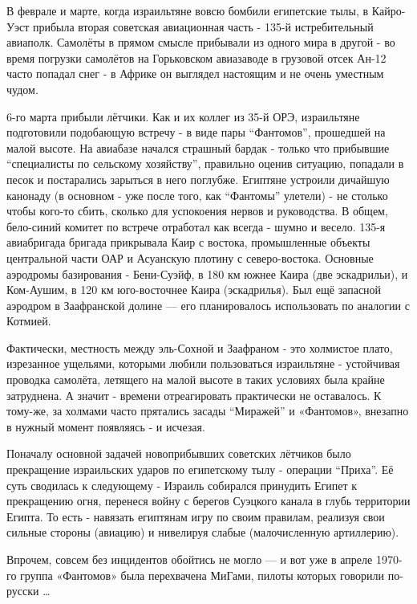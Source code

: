 В феврале и марте, когда израильтяне вовсю бомбили египетские тылы, в Кайро-Уэст прибыла вторая советская авиационная часть - 135-й истребительный авиаполк. Самолёты в прямом смысле прибывали из одного мира в другой - во время погрузки самолётов на Горьковском авиазаводе в грузовой отсек Ан-12 часто попадал снег - в Африке он выглядел настоящим и не очень уместным чудом.

6-го марта прибыли лётчики. Как и их коллег из 35-й ОРЭ, израильтяне подготовили подобающую встречу - в виде пары “Фантомов”, прошедшей на малой высоте. На авиабазе начался страшный бардак - только что прибывшие “специалисты по сельскому хозяйству”, правильно оценив ситуацию, попадали в песок и постарались зарыться в него поглубже. Египтяне устроили дичайшую канонаду (в основном - уже после того, как “Фантомы” улетели) - не столько чтобы кого-то сбить, сколько для успокоения нервов и руководства. В общем, бело-синий комитет по встрече отработал как всегда - шумно и весело. 
135-я авиабригада бригада прикрывала Каир с востока, промышленные объекты центральной части ОАР и Асуанскую плотину с северо-востока. Основные аэродромы базирования - Бени-Суэйф, в 180 км южнее Каира (две эскадрильи), и Ком-Аушим, в 120 км юго-восточнее Каира (эскадрилья). Был ещё запасной аэродром в Заафранской долине — его планировалось использовать по аналогии с Котмией.

Фактически, местность между эль-Сохной и Заафраном - это холмистое плато, изрезанное ущельями, которыми любили пользоваться израильтяне - устойчивая проводка самолёта, летящего на малой высоте в таких условиях была крайне затруднена. А значит - времени отреагировать практически не оставалось. К тому-же, за холмами часто прятались засады “Миражей” и «Фантомов», внезапно в нужный момент появляясь - и исчезая.

Поначалу основной задачей новоприбывших советских лётчиков было прекращение израильских ударов по египетскому тылу - операции “Приха”. Её суть сводилась к следующему - Израиль собирался принудить Египет к прекращению огня, перенеся войну с берегов Суэцкого канала в глубь территории Египта. То есть - навязать египтянам игру по своим правилам, реализуя свои сильные стороны (авиацию) и нивелируя слабые (малочисленную артиллерию).

Впрочем, совсем без инцидентов обойтись не могло — и вот уже в апреле 1970-го группа «Фантомов» была перехвачена МиГами, пилоты которых говорили по-русски …

